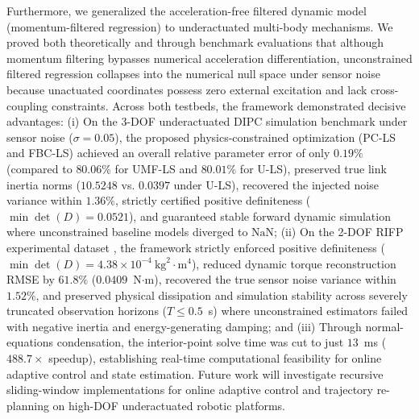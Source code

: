 \documentclass[lettersize,journal]{IEEEtran}
\begin{document}
Furthermore, we generalized the acceleration-free filtered dynamic model (momentum-filtered regression) \cite{GarciaAlarcon2012, AguilarSierra2014} to underactuated multi-body mechanisms. We proved both theoretically and through benchmark evaluations that although momentum filtering bypasses numerical acceleration differentiation, unconstrained filtered regression collapses into the numerical null space under sensor noise because unactuated coordinates possess zero external excitation and lack cross-coupling constraints. Across both testbeds, the framework demonstrated decisive advantages:
(i) On the 3-DOF underactuated DIPC simulation benchmark under sensor noise ($\sigma = 0.05$), the proposed physics-constrained optimization (PC-LS and FBC-LS) achieved an overall relative parameter error of only $0.19\%$ (compared to $80.06\%$ for UMF-LS and $80.01\%$ for U-LS), preserved true link inertia norms ($10.5248$ vs. $0.0397$ under U-LS), recovered the injected noise variance within $1.36\%$, strictly certified positive definiteness ($\min \det(D) = 0.0521$), and guaranteed stable forward dynamic simulation where unconstrained baseline models diverged to $\text{NaN}$;
(ii) On the 2-DOF RIFP experimental dataset \cite{AguilarSierra2014}, the framework strictly enforced positive definiteness ($\min \det(D) = 4.38 \times 10^{-4}~\text{kg}^2\cdot\text{m}^4$), reduced dynamic torque reconstruction RMSE by $61.8\%$ ($0.0409$~N$\cdot$m), recovered the true sensor noise variance within $1.52\%$, and preserved physical dissipation and simulation stability across severely truncated observation horizons ($T \le 0.5$~s) where unconstrained estimators failed with negative inertia and energy-generating damping; and
(iii) Through normal-equations condensation, the interior-point solve time was cut to just $13$~ms ($488.7\times$ speedup), establishing real-time computational feasibility for online adaptive control and state estimation. Future work will investigate recursive sliding-window implementations for online adaptive control and trajectory re-planning on high-DOF underactuated robotic platforms.



\end{document}
